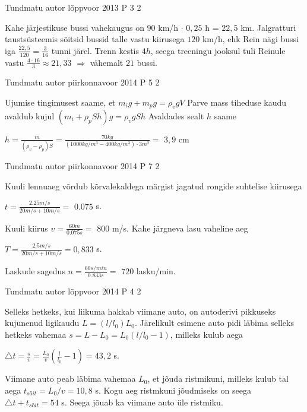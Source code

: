 \documentclass[11pt]{article}
\begin{document}
{%
{Tundmatu autor} %
{lõppvoor} %
{2013} %
{P 3} %
{2} %
{

\ifSolution
Kahe järjestikuse bussi vahekaugus on $90$ km/h $\cdot$ $0,25$ h = $22,5$ km. Jalgratturi taustsüsteemis sõitsid bussid talle vastu kiirusega $120$ km/h, ehk Rein nägi bussi iga $\frac{22,5}{120} = \frac{3}{16}$ tunni järel. Trenn kestis $4h$, seega treeningu jooksul tuli Reinule vastu $\frac{4 \cdot 16}{3} \approx 21,33$ $\Rightarrow$ vähemalt $21$ bussi.
\fi
}

{Tundmatu autor} %
{piirkonnavoor} %
{2014} %
{P 5} %
{2} %
{

\ifSolution
Ujumise tingimusest saame, et $m_i g + m_p g = \rho_v g V$
\newline
Parve mass tiheduse kaudu avaldub kujul $(m_i + \rho_p Sh)g = \rho_v g Sh$
\newline
Avaldades sealt $h$ saame
\begin{center}
$h= \frac{m}{(\rho_v -  \rho_p)S} = \frac{70kg}{(1000 kg/m^3 - 400 kg/m^3) \cdot 3 m^2} =$ $3,9$ cm
\end{center}
\fi
}

{Tundmatu autor} %
{piirkonnavoor} %
{2014} %
{P 7} %
{2} %
{

\ifSolution
Kuuli lennuaeg võrdub kõrvalekaldega märgist jagatud rongide suhtelise kiirusega
\begin{center}
$t = \frac{2.25 m/s}{20m/s + 10 m/s} =$ $0.075$ s.
\end{center}
Kuuli kiirus $v = \frac{60m}{0.075s} =$ $800$ m/s.
Kahe järgneva lasu vaheline aeg
\begin{center}
$T = \frac{2.5m/s}{20m/s + 10m/s} = 0,833$ s.
\end{center}
Laskude sagedus $n = \frac{60 s/min}{0.833s} =$ $720$ lasku/min.
\fi
}

{Tundmatu autor} %
{lõppvoor} %
{2014} %
{P 4} %
{2} %
{

\ifSolution
Selleks hetkeks, kui liikuma hakkab viimane auto, on autoderivi pikkuseks kujunenud ligikaudu $L = (l / l_0) L_0$. Järelikult esimene auto pidi läbima selleks hetkeks vahemaa $s = L - L_0 = L_0 (l/l_0 - 1)$, milleks kulub aega 
\begin{center}
$\triangle t = \frac{s}{v} = \frac{L_0}{v} (\frac{l}{l_0} - 1) = 43,2$ s.
\end{center}
Viimane auto peab läbima vahemaa $L_0$, et jõuda ristmikuni, milleks kulub tal aega $t_{sõit} = L_0 / v = 10,8$ s. Kogu aeg ristmkuni jõudmiseks on seega $\triangle t + t_{sõit} = 54$ s. Seega jõuab ka viimane auto üle ristmiku.
\fi
}

}
\end{document}

